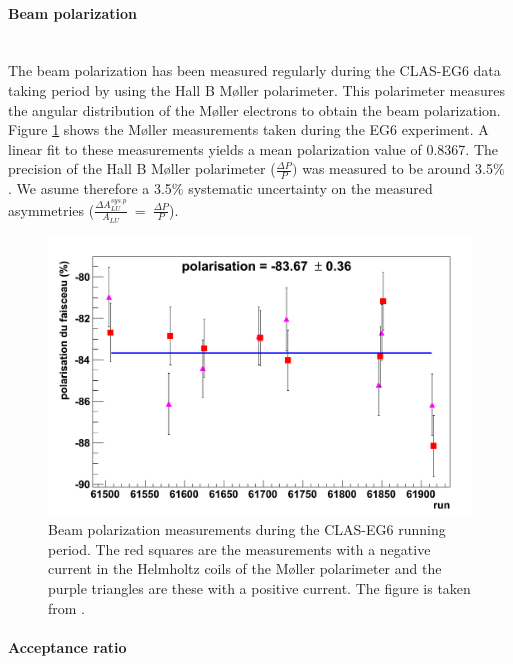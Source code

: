 \paragraph{Beam polarization}
~\\
   
The beam polarization has been measured regularly during the CLAS-EG6 data 
taking period by using the Hall B M\o ller polarimeter. This polarimeter 
measures the angular distribution of the M\o ller electrons to obtain the beam 
polarization. Figure \ref{fig:beam_polarization} shows the M\o ller 
measurements taken during the EG6 experiment. A linear fit to these 
measurements yields a mean polarization value of 0.8367. The precision of the 
Hall B M\o ller polarimeter ($\frac{\Delta P}{P})$ was measured to be around 
3.5$\%$ \cite{hallb_polarimeter}. We asume therefore a 3.5$\%$ systematic 
uncertainty on the measured asymmetries ($\frac{\Delta A^{sys.  
p}_{LU}}{A_{LU}}$~=~$\frac{\Delta P}{P}$).

\begin{figure}[tp]
\centering
\includegraphics[scale=0.25]{fig_dvcs/beam_polarization.png}
\caption{Beam polarization measurements during the CLAS-EG6 running period. The red squares are the measurements with a negative current in the Helmholtz coils of the M\o ller polarimeter and the purple triangles are these with a positive current. The figure is taken from \cite{yohann}.} 
\label{fig:beam_polarization}
\end{figure}


\paragraph{Acceptance ratio}
~\\

